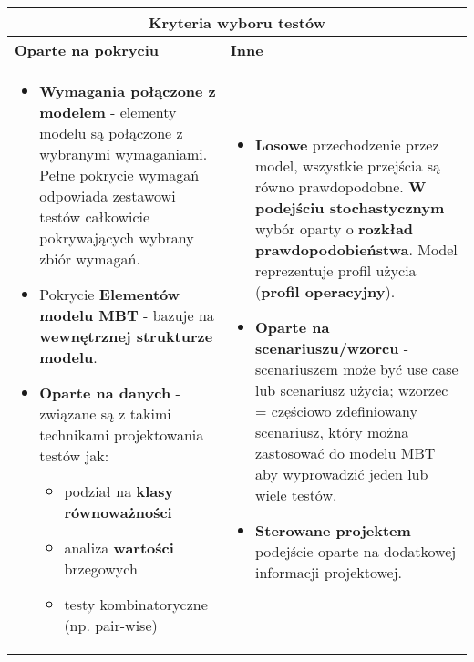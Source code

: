 \documentclass[../main.tex]{subfiles}
\begin{document}
    \begin{table}[H]
        \begin{center}
            \begin{tabular}{| p{8cm} | p{8cm} |}
                \hline
                \multicolumn{2}{|c|}{\textbf{Kryteria wyboru testów}} \\
                \hline
                \textbf{Oparte na pokryciu} & \textbf{Inne} \\
                \hline
                \begin{itemize}
                    \item \textbf{Wymagania połączone z modelem} - elementy modelu są połączone z wybranymi
                    wymaganiami. Pełne pokrycie wymagań odpowiada zestawowi testów całkowicie pokrywających wybrany zbiór wymagań.

                    \item Pokrycie \textbf{Elementów modelu MBT} - bazuje na \textbf{wewnętrznej strukturze modelu}.

                    \item \textbf{Oparte na danych} - związane są z takimi technikami projektowania testów jak:
                    \begin{itemize}
                        \item podział na \textbf{klasy równoważności}
                        \item analiza \textbf{wartości} brzegowych
                        \item testy kombinatoryczne (np. pair-wise)
                    \end{itemize}
                \end{itemize}
                &
                \begin{itemize}
                    \item \textbf{Losowe} przechodzenie przez model, wszystkie przejścia są równo
                    prawdopodobne. \textbf{W podejściu stochastycznym} wybór oparty o \textbf{rozkład prawdopodobieństwa}. Model reprezentuje profil
                    użycia (\textbf{profil operacyjny}).
                    \item \textbf{Oparte na scenariuszu/wzorcu} - scenariuszem może być use case lub
                    scenariusz użycia; wzorzec = częściowo zdefiniowany scenariusz, który można
                    zastosować do modelu MBT aby wyprowadzić jeden lub wiele testów.
                    \item \textbf{Sterowane projektem} - podejście oparte na dodatkowej informacji projektowej.
                \end{itemize} \\
                \hline
            \end{tabular}
        \end{center}
    \end{table}
\end{document}
